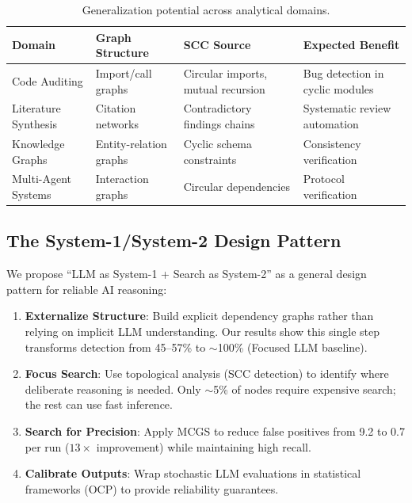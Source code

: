 \documentclass{article}
\begin{document}
\begin{table}[t]
\caption{Generalization potential across analytical domains.}
\label{tab:generalization}
\centering
\small
\begin{tabular}{p{2.2cm}p{2.5cm}p{2.5cm}p{3cm}}
\toprule
\textbf{Domain} & \textbf{Graph Structure} & \textbf{SCC Source} & \textbf{Expected Benefit} \\
\midrule
Code Auditing & Import/call graphs & Circular imports, mutual recursion & Bug detection in cyclic modules \\
Literature Synthesis & Citation networks & Contradictory findings chains & Systematic review automation \\
Knowledge Graphs & Entity-relation graphs & Cyclic schema constraints & Consistency verification \\
Multi-Agent Systems & Interaction graphs & Circular dependencies & Protocol verification \\
\bottomrule
\end{tabular}
\end{table}

\subsection{The System-1/System-2 Design Pattern}

We propose ``LLM as System-1 + Search as System-2'' as a general design pattern for reliable AI reasoning:

\begin{enumerate}[leftmargin=*,itemsep=1pt]
    \item \textbf{Externalize Structure}: Build explicit dependency graphs rather than relying on implicit LLM understanding. Our results show this single step transforms detection from 45--57\% to $\sim$100\% (Focused LLM baseline).
    \item \textbf{Focus Search}: Use topological analysis (SCC detection) to identify where deliberate reasoning is needed. Only $\sim$5\% of nodes require expensive search; the rest can use fast inference.
    \item \textbf{Search for Precision}: Apply MCGS to reduce false positives from 9.2 to 0.7 per run ($13\times$ improvement) while maintaining high recall.
    \item \textbf{Calibrate Outputs}: Wrap stochastic LLM evaluations in statistical frameworks (OCP) to provide reliability guarantees.
\end{enumerate}
\end{document}
